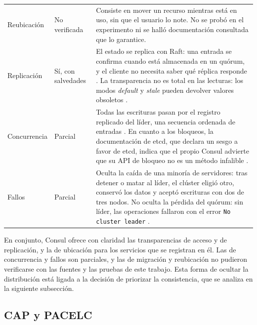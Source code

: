 \documentclass[12pt,a4paper]{article}
\begin{document}
\begin{longtable}{
    >{\raggedright\arraybackslash}p{2.6cm}
    >{\raggedright\arraybackslash}p{2.4cm}
    >{\raggedright\arraybackslash}p{
        \dimexpr\textwidth-5cm-6\tabcolsep\relax
    }
}
    \addlinespace[4pt]

    Reubicación & No verificada &
      Consiste en mover un recurso mientras está en uso,
      sin que el usuario lo note. No se probó en el
      experimento ni se halló documentación consultada
      que lo garantice. \\

    \addlinespace[4pt]

    Replicación & Sí, con salvedades &
      El estado se replica con Raft: una entrada se confirma
      cuando está almacenada en un quórum, y el cliente no
      necesita saber qué réplica responde
      \cite{consul_consensus}. La transparencia no es total
      en las lecturas: los modos \textit{default} y
      \textit{stale} pueden devolver valores obsoletos
      \cite{consul_consensus}. \\

    \addlinespace[4pt]

    Concurrencia & Parcial &
      Todas las escrituras pasan por el registro replicado
      del líder, una secuencia ordenada de entradas
      \cite{consul_consensus}. En cuanto a los bloqueos,
      la documentación de etcd, que declara un sesgo a
      favor de etcd, indica que el propio Consul advierte
      que su API de bloqueo no es un método infalible
      \cite{etcd_why}. \\

    \addlinespace[4pt]

    Fallos & Parcial &
      Oculta la caída de una minoría de servidores: tras
      detener o matar al líder, el clúster eligió otro,
      conservó los datos y aceptó escrituras con dos de
      tres nodos. No oculta la pérdida del quórum: sin
      líder, las operaciones fallaron con el error
      \texttt{No cluster leader}
      \cite{consul_consensus}. \\

\end{longtable}
\endgroup


En conjunto, Consul ofrece con claridad las transparencias de acceso y de replicación, y la de
ubicación para los servicios que se registran en él. Las de concurrencia y fallos son
parciales, y las de migración y reubicación no pudieron verificarse con las fuentes y las
pruebas de este trabajo. Esta forma de ocultar la distribución está ligada a la decisión de
priorizar la consistencia, que se analiza en la siguiente subsección.

\subsection{CAP y PACELC}
\end{document}
